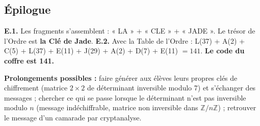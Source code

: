 \documentclass[11pt,a4paper]{article}
\newcommand{\Z}{\mathbb{Z}}
\begin{document}
	\subsection*{Épilogue}
	\textbf{E.1.} Les fragments s'assemblent : « LA » + « CLE » + « JADE ».
	Le trésor de l'Ordre est \textbf{la Clé de Jade}.
	\textbf{E.2.} Avec la Table de l'Ordre :
	L(37) + A(2) + C(5) + L(37) + E(11) + J(29) + A(2) + D(7) + E(11)
	$= 141$.
	\textbf{Le code du coffre est 141.}
	
	\vspace{3mm}
	\begin{conseil}
		\textbf{Prolongements possibles :} faire générer aux élèves leurs propres
		clés de chiffrement (matrice $2\times2$ de déterminant inversible modulo 7)
		et s'échanger des messages ; chercher ce qui se passe lorsque le
		déterminant n'est pas inversible modulo $n$ (message indéchiffrable,
		matrice non inversible dans $\Z/n\Z$) ; retrouver le message d'un camarade
		par cryptanalyse.
	\end{conseil}
	
\end{document}
